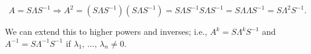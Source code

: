 \documentclass[reqno]{amsart}
\theoremstyle{definition}
\newenvironment{altpf}{%
  \renewcommand{\proofname}{Alternate proof}\proof}{\endproof}
\begin{document}
\begin{altpf}
\begin{equation*}
A = S\Lambda S^{-1} \Rightarrow A^2 = \left(S\Lambda S^{-1}\right)\left(S\Lambda S^{-1}\right)
= S\Lambda S^{-1}S\Lambda S^{-1} = S\Lambda\Lambda S^{-1} = S\Lambda^2S^{-1}.
\end{equation*}
\end{altpf}

{\color{blue} We can extend this to higher powers and inverses; i.e., $A^k = S\Lambda^k S^{-1}$
and $A^{-1} = S\Lambda^{-1}S^{-1}$ if $\lambda_1,\,\ldots,\,\lambda_n \neq 0$.}
\end{document}
